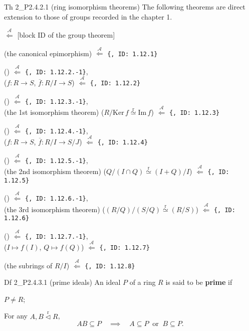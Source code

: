 \documentclass{article}
\newcommand{\nles}{\vartriangleleft}
\newcommand{\Ker}{\text{Ker}\,}
\newcommand{\Ima}{\text{Im}\,}
\newcommand{\Riso}{\overset{\text{r}}{\simeq}} %
\newcommand{\ideal}{\overset{\text{r}}{\nles}} %
\begin{document}
\begin{Th}{Th 2\_P2.4.2.1 (ring isomorphism theorems)}
    The following theorems are direct extension to those of groups recorded in the chapter 1.
    \begin{compactenum}
        \item[$\bullet$] [(The mark of the ring theorem)] $\overset{\mathcal{A}}{\Longleftarrow}$ [block ID of the group theorem]
        \item (the canonical epimorphism) $\overset{\mathcal{A}}{\Longleftarrow}$ \verb|{, ID: 1.12.1}|
        \item () $\overset{\mathcal{A}}{\Longleftarrow}$ \verb|{, ID: 1.12.2.-1}|, \\ 
        ($f: R\to S$, $\overline{f}: R/I\to S$) $\overset{\mathcal{A}}{\Longleftarrow}$ \verb|{, ID: 1.12.2}|
        \item () $\overset{\mathcal{A}}{\Longleftarrow}$ \verb|{, ID: 1.12.3.-1}|, \\ 
        (the 1st isomorphism theorem) ($R/\Ker f\Riso \Ima f$) $\overset{\mathcal{A}}{\Longleftarrow}$ \verb|{, ID: 1.12.3}|
        \item () $\overset{\mathcal{A}}{\Longleftarrow}$ \verb|{, ID: 1.12.4.-1}|, \\ 
        ($f: R\to S$, $\overline{f}: R/I\to S/J$) $\overset{\mathcal{A}}{\Longleftarrow}$ \verb|{, ID: 1.12.4}|
        \item () $\overset{\mathcal{A}}{\Longleftarrow}$ \verb|{, ID: 1.12.5.-1}|, \\ 
        (the 2nd isomorphism theorem) ($ Q/(I\cap Q) \Riso (I+Q)/I $) $\overset{\mathcal{A}}{\Longleftarrow}$ \verb|{, ID: 1.12.5}|
        \item () $\overset{\mathcal{A}}{\Longleftarrow}$ \verb|{, ID: 1.12.6.-1}|, \\ 
        (the 3rd isomorphism theorem) ($ (R/Q)\Big/ (S/Q) \Riso (R/S) $) $\overset{\mathcal{A}}{\Longleftarrow}$ \verb|{, ID: 1.12.6}|
        \item () $\overset{\mathcal{A}}{\Longleftarrow}$ \verb|{, ID: 1.12.7.-1}|, \\ 
        ($I\mapsto f(I)$, $Q\mapsto f(Q)$) $\overset{\mathcal{A}}{\Longleftarrow}$ \verb|{, ID: 1.12.7}|
        \item (the subrings of $R/I$) $\overset{\mathcal{A}}{\Longleftarrow}$ \verb|{, ID: 1.12.8}|
    \end{compactenum}
\end{Th}

\begin{Df}{Df 2\_P2.4.3.1 (prime ideals)}
    An ideal $P$ of a ring $R$ is said to be \textbf{prime} if
    \begin{compactenum}
        \item $P\neq R$;
        \item For any $A, B\ideal R$, 
        $$ AB\subseteq P \quad\implies\quad A\subseteq P \;\;\text{or}\;\; B\subseteq P. $$
    \end{compactenum}
\end{Df}
\end{document}
